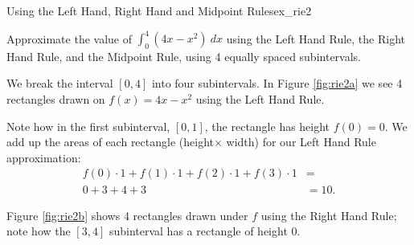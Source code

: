\begin{example}{Using the Left Hand, Right Hand and Midpoint Rules}{ex_rie2}
 
Approximate the value of $\int_0^4 (4x-x^2)\ dx$ using the Left Hand Rule, the Right Hand Rule, and the Midpoint Rule, using 4 equally spaced subintervals.
 
 We break the interval $[0,4]$ into four subintervals. In Figure \ref{fig:rie2a} we see 4 rectangles drawn on $f(x) = 4x-x^2$ using the Left Hand Rule. 

\begin{minipage}[t]{\linewidth}
\caption{Approximating the area under $f(x)= 4x-x^2$ on $ [0,4] $ using the Left Hand Rule \label{fig:rie2a}}
\end{minipage}

\noindent Note how in the first subinterval, $[0,1]$, the rectangle has height $f(0)=0$. We add up the areas of each rectangle (height$\times$ width) for our Left Hand Rule approximation:
	\begin{align*} f(0)\cdot 1 + f(1)\cdot 1+ f(2)\cdot 1+f(3)\cdot 1 &=\\
	0+3+4+3&= 10.
	\end{align*}
	
Figure \ref{fig:rie2b} shows 4 rectangles drawn under $f$ using the Right Hand Rule; note how the $[3,4]$ subinterval has a rectangle of height 0. 
\begin{minipage}[t]{\linewidth}
\caption{Approximating the area under $f(x)= 4x-x^2$ on $ [0,4] $ using the Right Hand Rule \label{fig:rie2b}}
\end{minipage}


\end{example}

